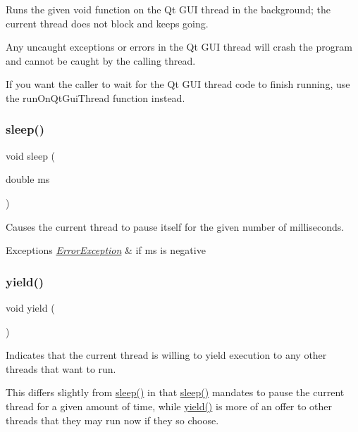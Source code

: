 Runs the given void function on the Qt G\+UI thread in the background; the current thread does not block and keeps going. 

Any uncaught exceptions or errors in the Qt G\+UI thread will crash the program and cannot be caught by the calling thread.

If you want the caller to wait for the Qt G\+UI thread code to finish running, use the {\ttfamily run\+On\+Qt\+Gui\+Thread} function instead. \mbox{\label{classGThread_aa3381590c1ef33c08000c2fbb2bf0dd0}} 
\subsubsection{\texorpdfstring{sleep()}{sleep()}}
{\footnotesize\ttfamily void sleep (\begin{DoxyParamCaption}\item[{double}]{ms }\end{DoxyParamCaption})\hspace{0.3cm}{\ttfamily [static]}}



Causes the current thread to pause itself for the given number of milliseconds. 


\begin{DoxyExceptions}{Exceptions}
{\em \mbox{\hyperlink{classErrorException}{Error\+Exception}}} & if ms is negative \\
\hline
\end{DoxyExceptions}
\mbox{\label{classGThread_a58c8b2ad0ea491a6642e5e1cbd358c89}} 
\subsubsection{\texorpdfstring{yield()}{yield()}}
{\footnotesize\ttfamily void yield (\begin{DoxyParamCaption}{ }\end{DoxyParamCaption})\hspace{0.3cm}{\ttfamily [static]}}



Indicates that the current thread is willing to yield execution to any other threads that want to run. 

This differs slightly from \mbox{\hyperlink{classGThread_aa3381590c1ef33c08000c2fbb2bf0dd0}{sleep()}} in that \mbox{\hyperlink{classGThread_aa3381590c1ef33c08000c2fbb2bf0dd0}{sleep()}} mandates to pause the current thread for a given amount of time, while \mbox{\hyperlink{classGThread_a58c8b2ad0ea491a6642e5e1cbd358c89}{yield()}} is more of an offer to other threads that they may run now if they so choose. 

